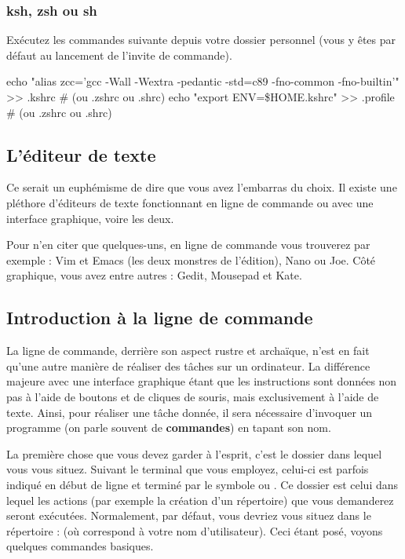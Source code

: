 \subsubsection{ksh, zsh ou sh}\label{ksh-zsh-ou-sh}

Exécutez les commandes suivante depuis votre dossier personnel (vous y
êtes par défaut au lancement de l'invite de commande).

\begin{bash}
  echo "alias zcc='gcc -Wall -Wextra -pedantic -std=c89 -fno-common -fno-builtin'"
  >> .kshrc # (ou .zshrc ou .shrc) echo "export ENV=\$HOME.kshrc"
  >> .profile # (ou .zshrc ou .shrc)
\end{bash}

\subsection{L'éditeur de texte}\label{luxe9diteur-de-texte-2}

Ce serait un euphémisme de dire que vous avez l'embarras du choix. Il
existe une pléthore d'éditeurs de texte fonctionnant en ligne de
commande ou avec une interface graphique, voire les deux.

Pour n'en citer que quelques-uns, en ligne de commande vous trouverez
par exemple : Vim et Emacs (les deux monstres de l'édition), Nano ou
Joe. Côté graphique, vous avez entre autres : Gedit, Mousepad et Kate.

\subsection{Introduction à la ligne de
  commande}\label{introduction-uxe0-la-ligne-de-commande-2}

La ligne de commande, derrière son aspect rustre et archaïque, n'est
en fait qu'une autre manière de réaliser des tâches sur un
ordinateur. La différence majeure avec une interface graphique étant
que les instructions sont données non pas à l'aide de boutons et de
cliques de souris, mais exclusivement à l'aide de texte. Ainsi, pour
réaliser une tâche donnée, il sera nécessaire d'invoquer un programme
(on parle souvent de \textbf{commandes}) en tapant son nom.

La première chose que vous devez garder à l'esprit, c'est le dossier
dans lequel vous vous situez. Suivant le terminal que vous employez,
celui-ci est parfois indiqué en début de ligne et terminé par le
symbole \mybox{\$} ou \mybox{\%}. Ce dossier est celui dans lequel les
actions (par exemple la création d'un répertoire) que vous demanderez
seront exécutées. Normalement, par défaut, vous devriez vous situez
dans le répertoire :  (où 
correspond à votre nom d'utilisateur). Ceci étant posé, voyons
quelques commandes basiques.

